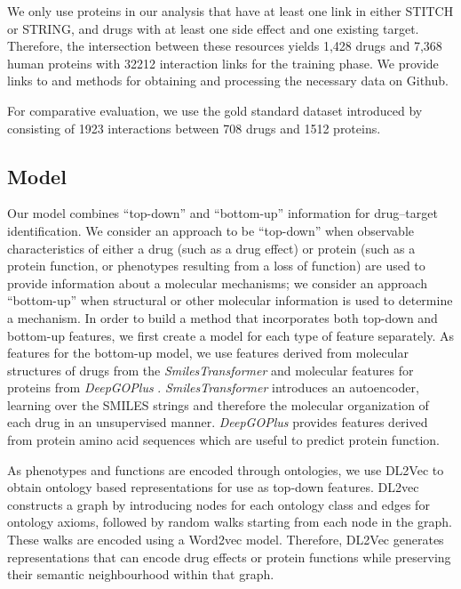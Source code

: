 \documentclass{bioinfo}
\begin{document}
We only use proteins in our analysis that have at least one link in
either STITCH or STRING, and drugs with at least one side effect and
one existing target. Therefore, the intersection between these
resources yields 1,428 drugs and 7,368 human proteins with 32212 interaction links for the training phase. We provide links to and methods for obtaining and processing
the necessary data on Github.

For comparative evaluation, we use the gold standard dataset
introduced by \citet{Yamanishi2008} consisting of 1923 interactions between 708 drugs and 1512 proteins.
 
\subsection{Model}

Our model combines ``top-down'' and ``bottom-up'' information for
drug--target identification. We consider an approach to be
``top-down'' when observable characteristics of either a drug (such as
a drug effect) or protein (such as a protein function, or phenotypes
resulting from a loss of function) are used to provide information
about a molecular mechanisms; we consider an approach ``bottom-up''
when structural or other molecular information is used to determine a
mechanism.  In order to build a method that incorporates both top-down
and bottom-up features, we first create a model for each type of
feature separately.  As features for the bottom-up model, we use
features derived from molecular structures of drugs from the
\textit{SmilesTransformer} \citep{SmilesTransformer} and molecular
features for proteins from \textit{DeepGOPlus}
\citep{DeepGoPlus}. \textit{SmilesTransformer} introduces an
autoencoder, learning over the SMILES strings and therefore the
molecular organization of each drug in an unsupervised manner. 
\textit{DeepGOPlus} provides  features derived from protein amino acid
sequences which are useful to predict protein function.

As phenotypes and functions are encoded through ontologies, we use
DL2Vec \citep{DL2vec2020} to obtain ontology based representations for
use as top-down features. DL2vec constructs a graph by introducing
nodes for each ontology class and edges for ontology axioms, followed
by random walks starting from each node in the graph. These walks are
encoded using a Word2vec \citep{Word2vec2013} model. Therefore, DL2Vec
generates representations that can encode drug effects or protein
functions while preserving their semantic neighbourhood within that
graph.
\end{document}
